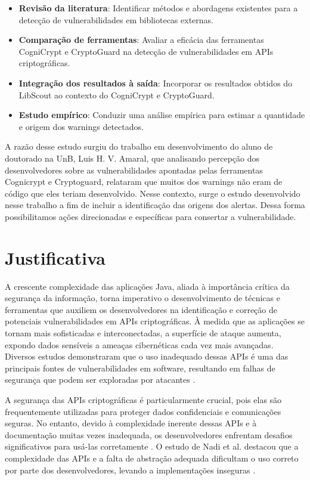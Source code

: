 \begin{itemize}
    \item \textbf{Revisão da literatura}: Identificar métodos e abordagens existentes para a detecção de vulnerabilidades em bibliotecas externas.
    \item \textbf{Comparação de ferramentas}: Avaliar a eficácia das ferramentas CogniCrypt e CryptoGuard na detecção de vulnerabilidades em APIs criptográficas.
    \item \textbf{Integração dos resultados à saída}: Incorporar os resultados obtidos do LibScout ao contexto do CogniCrypt e CryptoGuard.
    \item \textbf{Estudo empírico}: Conduzir uma análise empírica para estimar a quantidade e origem dos warnings detectados.
\end{itemize}

A razão desse estudo surgiu do trabalho em desenvolvimento do aluno de doutorado na UnB, Luis H. V. Amaral, que analisando percepção dos desenvolvedores sobre as vulnerabilidades apontadas pelas ferramentas Cognicrypt e Cryptoguard, relataram que muitos dos warnings não eram de código que eles teriam desenvolvido.  Nesse contexto, surge o estudo desenvolvido nesse trabalho a fim de incluir a identificação das origens dos alertas. Dessa forma possibilitamos ações direcionadas e específicas para consertar a vulnerabilidade.

\section{Justificativa}

A crescente complexidade das aplicações Java, aliada à importância crítica da segurança da informação, torna imperativo o desenvolvimento de técnicas e ferramentas que auxiliem os desenvolvedores na identificação e correção de potenciais vulnerabilidades em APIs criptográficas. À medida que as aplicações se tornam mais sofisticadas e interconectadas, a superfície de ataque aumenta, expondo dados sensíveis a ameaças cibernéticas cada vez mais avançadas. Diversos estudos demonstraram que o uso inadequado dessas APIs é uma das principais fontes de vulnerabilidades em software, resultando em falhas de segurança que podem ser exploradas por atacantes \cite{api_misuses_zhang, nadi_icse_2016}.

A segurança das APIs criptográficas é particularmente crucial, pois elas são frequentemente utilizadas para proteger dados confidenciais e comunicações seguras. No entanto, devido à complexidade inerente dessas APIs e à documentação muitas vezes inadequada, os desenvolvedores enfrentam desafios significativos para usá-las corretamente \cite{nadi_icse_2016}. O estudo de Nadi et al. destacou que a complexidade das APIs e a falta de abstração adequada dificultam o uso correto por parte dos desenvolvedores, levando a implementações inseguras \cite{nadi_icse_2016}.


